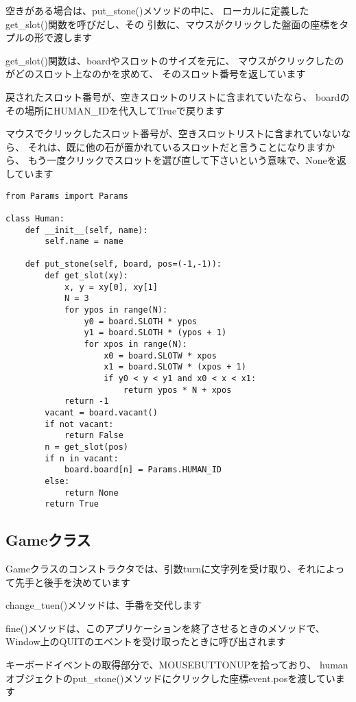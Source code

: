\documentclass[uplatex,a4paper,11pt,oneside,openany]{jsbook}
\begin{document}
空きがある場合は、put\_stone()メソッドの中に、
ローカルに定義したget\_slot()関数を呼びだし、その
引数に、マウスがクリックした盤面の座標をタプルの形で渡します

get\_slot()関数は、boardやスロットのサイズを元に、
マウスがクリックしたのがどのスロット上なのかを求めて、
そのスロット番号を返しています

戻されたスロット番号が、空きスロットのリストに含まれていたなら、
boardのその場所にHUMAN\_IDを代入してTrueで戻ります

マウスでクリックしたスロット番号が、空きスロットリストに含まれていないなら、
それは、既に他の石が置かれているスロットだと言うことになりますから、
もう一度クリックでスロットを選び直して下さいという意味で、Noneを返しています

\begin{lstlisting}[caption=class Human,label=prog05-1]
from Params import Params

class Human:
    def __init__(self, name):
        self.name = name

    def put_stone(self, board, pos=(-1,-1)):
        def get_slot(xy):
            x, y = xy[0], xy[1]
            N = 3
            for ypos in range(N):
                y0 = board.SLOTH * ypos
                y1 = board.SLOTH * (ypos + 1)
                for xpos in range(N):
                    x0 = board.SLOTW * xpos
                    x1 = board.SLOTW * (xpos + 1)
                    if y0 < y < y1 and x0 < x < x1:
                        return ypos * N + xpos
            return -1
        vacant = board.vacant()
        if not vacant:
            return False
        n = get_slot(pos)
        if n in vacant:
            board.board[n] = Params.HUMAN_ID
        else:
            return None
        return True
\end{lstlisting}%

\subsection{Gameクラス}

Gameクラスのコンストラクタでは、引数turnに文字列を受け取り、それによって先手と後手を決めています

change\_tuen()メソッドは、手番を交代します

fine()メソッドは、このアプリケーションを終了させるときのメソッドで、Window上のQUITのエベントを受け取ったときに呼び出されます

キーボードイベントの取得部分で、MOUSEBUTTONUPを拾っており、
humanオブジェクトのput\_stone()メソッドにクリックした座標event.posを渡しています
\end{document}
